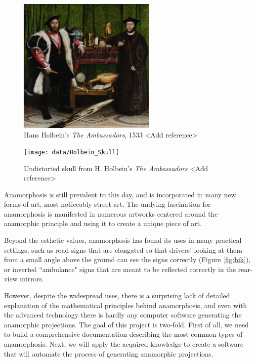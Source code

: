 \documentclass[11pt, oneside, reqno]{book}
\begin{document}
\begin{figure}
\centering
\includegraphics[width=0.6\textwidth]{data/Holbein1}
\caption{Hans Holbein's \textit{The Ambassadors}, 1533 <Add reference>} %
\label{fig:hol}
\end{figure}

\begin{figure}
\centering
\texttt{[image: data/Holbein\_Skull]}
\caption{Undistorted skull from H. Holbein's \textit{The Ambassadors} <Add reference>} %
\label{fig:hol_sku}
\end{figure}

Anamorphosis is still prevalent to this day, and is incorporated in many new forms of art, most noticeably street art. The undying fascination for anamorphosis is manifested in numerous artworks centered around the anamorphic principle and using it to create a unique piece of art.

Beyond the esthetic values, anamorphosis has found its uses in many practical settings, such as road signs that are elongated so that drivers' looking at them from a small angle above the ground can see the signs correctly (Figure \ref{fig:bik}), or inverted ``ambulance" signs that are meant to be reflected correctly in the rear-view mirrors.

However, despite the widespread uses, there is a surprising lack of detailed explanation of the mathematical principles behind anamorphosis, and even with the advanced technology there is hardly any computer software generating the anamorphic projections. The goal of this project is two-fold. First of all, we need to build a comprehensive documentation describing the most common types of anamorphosis. Next, we will apply the acquired knowledge to create a software that will automate the process of generating anamorphic projections.
\end{document}
